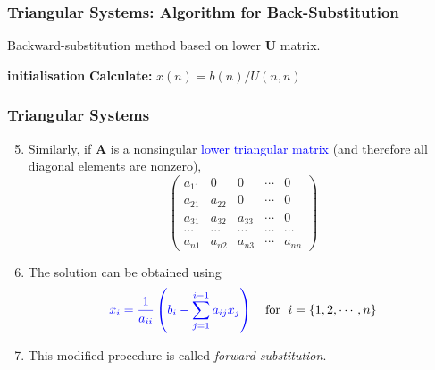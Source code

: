 \documentclass[10pt,compress,handout,ignorenonframetext]{beamer}
\begin{document}
\begin{frame}[fragile]
  \frametitle{Triangular Systems: Algorithm for Back-Substitution} 
    \begin{algorithm}[H]\caption{Backward-substitution method based on lower $\bm{U}$ matrix.}
      {\bf initialisation}\;
      {\bf Calculate:} $x(n) = b(n) / U(n,n)$\;
       \label{linalg:algbacksubst}
    \end{algorithm}
\end{frame}


\begin{frame}
  \frametitle{Triangular Systems} 
  \begin{enumerate}
  \setcounter{enumi}{4}
    \item <1-> Similarly, if $\bm{A}$ is a nonsingular \textcolor{blue}{lower triangular matrix}  (and therefore all diagonal elements are nonzero),  
      \begin{displaymath}
         \begin{pmatrix}
           a_{11} & 0     & 0     & \cdots & 0 \\
           a_{21} & a_{22} & 0     & \cdots & 0 \\
           a_{31} & a_{32} & a_{33} & \cdots & 0 \\
           \cdots & \cdots & \cdots & \cdots & \cdots \\
           a_{n1} & a_{n2} & a_{n3} & \cdots & a_{nn}       
         \end{pmatrix}
      \end{displaymath}
    \item <2-> The solution can be obtained using
       \begin{equation}
          \textcolor{blue}{x_{i} = \frac{1}{a_{ii}}\left(b_{i} - \sum\limits_{j=1}^{i-1}a_{ij} x_{j}\right)}\;\;\;\text{ for } \; i=\left\{1, 2, \cdots, n\right\}\label{linalg:lowermatrix}
       \end{equation}
    \item <3-> This modified procedure is called {\it forward-substitution}.
  \end{enumerate}
\end{frame}
\end{document}
